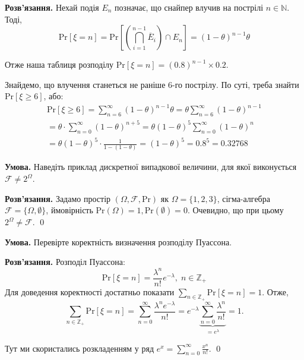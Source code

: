 \documentclass[oneside,solution]{karazin-prob-theory-assign}
\begin{document}
\textbf{Розв'язання.} Нехай подія $E_n$ позначає, що снайпер влучив на пострілі $n \in \mathbb{N}$. Тоді, 
\begin{equation}
    \text{Pr}[\xi=n] = \text{Pr}\left[\left(\bigcap_{i=1}^{n-1}\overline{E}_i\right) \cap E_n\right] = (1-\theta)^{n-1}\theta
\end{equation}

Отже наша таблиця розподілу $\text{Pr}[\xi=n] = (0.8)^{n-1} \times 0.2$.

Знайдемо, що влучення станеться не раніше 6-го пострілу. По суті, треба знайти $\text{Pr}[\xi \geq 6]$, або:
\begin{gather}
    \text{Pr}[\xi \geq 6] = \sum_{n=6}^{\infty}(1-\theta)^{n-1}\theta = \theta \sum_{n=6}^{\infty}(1-\theta)^{n-1} \nonumber \\
    = \theta \cdot \sum_{n=0}^{\infty}(1-\theta)^{n+5} = \theta(1-\theta)^{5}\sum_{n=0}^{\infty}(1-\theta)^n \nonumber \\
    = \theta(1-\theta)^5 \cdot \frac{1}{1-(1-\theta)} = (1-\theta)^5 = 0.8^5 = 0.32768
\end{gather}


\hspace{20px}\textbf{Умова.} Наведіть приклад дискретної випадкової величини, для якої виконується $\mathcal{F} \neq 2^{\Omega}$.

\textbf{Розв'язання.} Задамо простір $(\Omega,\mathcal{F},\text{Pr})$ як $\Omega = \{1,2,3\}$, сігма-алгебра $\mathcal{F} = \{\Omega,\emptyset\}$, ймовірність $\text{Pr}(\Omega) = 1, \text{Pr}(\emptyset) = 0$. Очевидно, що при цьому $2^{\Omega} \neq \mathcal{F}$. \qed


\hspace{20px}\textbf{Умова.} Перевірте коректність визначення розподілу Пуассона. 

\textbf{Розв'язання.} Розподіл Пуассона:
\begin{equation}
    \text{Pr}[\xi=n] = \frac{\lambda^n}{n!}e^{-\lambda}, \; n \in \mathbb{Z}_+
\end{equation}
Для доведення коректності достатньо показати $\sum_{n \in \mathbb{Z}_+}\text{Pr}[\xi=n]=1$. Отже,
\begin{equation}
    \sum_{n \in \mathbb{Z}_+}\text{Pr}[\xi=n] = \sum_{n=0}^{\infty} \frac{\lambda^n e^{-\lambda}}{n!} = e^{-\lambda}\underbrace{\sum_{n=0}^{\infty} \frac{\lambda^n}{n!}}_{=e^{\lambda}} = 1.
\end{equation}

Тут ми скористались розкладенням у ряд $e^x=\sum_{n=0}^{\infty} \frac{x^n}{n!}$. \qed
\end{document}
